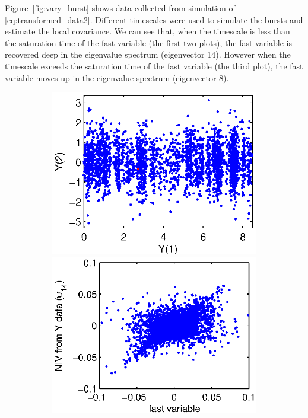 \documentclass[1p]{elsarticle}
\begin{document}
Figure~\ref{fig:vary_burst} shows data collected from simulation of \eqref{eq:transformed_data2}.
%
Different timescales were used to simulate the bursts and estimate the local covariance. 
%
We can see that, when the timescale is less than the saturation time of the fast variable (the first two plots), the fast variable is recovered deep in the eigenvalue spectrum (eigenvector 14).
%
However when the timescale exceeds the saturation time of the fast variable (the third plot), the fast variable moves up in the eigenvalue spectrum (eigenvector 8).

\begin{figure}[h]
%
\begin{subfigure}{0.3\textwidth}
\includegraphics[width=\textwidth]{data_withburst_1}
\includegraphics[width=\textwidth]{fast_var_corr_1}

\end{subfigure}
\end{figure}
\end{document}
